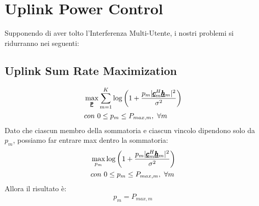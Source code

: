 \section{Uplink Power Control}
Supponendo di aver tolto l'Interferenza Multi-Utente, i nostri problemi si ridurranno nei seguenti:
\subsection{Uplink Sum Rate Maximization}
\begin{equation*}
    \begin{aligned}
    &\max_{\pmb{\underline{p}}} \sum_{m=1}^K \log\left(1 + \frac{p_m |\pmb{\underline{c}}_m^H \pmb{\underline{h}}_m |^2}{\sigma^2} \right) \\
     &con  \ 0 \leq p_m \leq P_{max,m}, \ \forall m
     \end{aligned}
\end{equation*}
Dato che ciascun membro della sommatoria e ciascun vincolo dipendono solo da $p_m$, possiamo far entrare max dentro la sommatoria:
\begin{equation*}
    \begin{aligned}
     &\max_{p_m}\log\left(1 + \frac{p_m |\pmb{\underline{c}}_m^H \pmb{\underline{h}}_m |^2}{\sigma^2} \right) \\
     & con  \ 0 \leq p_m \leq P_{max,m}, \ \forall m
    \end{aligned}
\end{equation*}
Allora il risultato è:
\begin{equation*}
    p_m = P_{max,m}
\end{equation*}

